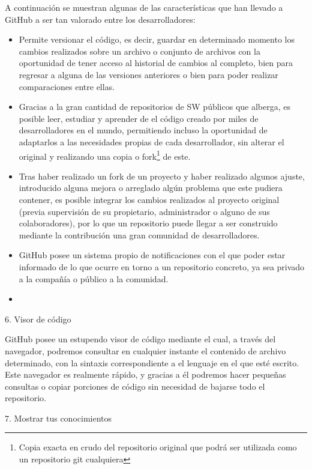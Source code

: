 A continuación se muestran algunas de las características que han llevado a GitHub a ser tan valorado entre los desarrolladores\cite{quintana2015}:

\begin{itemize}
	\item Permite versionar el código, es decir, guardar en determinado momento los cambios realizados sobre un archivo o conjunto de archivos con la oportunidad de tener acceso al historial de cambios al completo, bien para regresar a alguna de las versiones anteriores o bien para poder realizar comparaciones entre ellas.
	\item Gracias a la gran cantidad de repositorios de \gls{SW} públicos que alberga, es posible leer, estudiar y aprender de el código creado por miles de desarrolladores en el mundo, permitiendo incluso la oportunidad de adaptarlos a las necesidades propias de cada desarrollador, sin alterar el original y realizando una copia o fork\footnote{Copia exacta en crudo del repositorio original que podrá ser utilizada como un repositorio git cualquiera} de este.
	\item Tras haber realizado un fork de un proyecto y haber realizado algunos ajuste, introducido alguna mejora o arreglado algún problema que este pudiera contener, es posible integrar los cambios realizados al proyecto original (previa supervisión de su propietario, administrador o alguno de sus colaboradores), por lo que un repositorio puede llegar a ser construido mediante la contribución una gran comunidad de desarrolladores.
	\item GitHub posee un sistema propio de notificaciones con el que poder estar informado de lo que ocurre en torno a un repositorio concreto, ya sea privado a la compañía o público a la comunidad.
	\item 
\end{itemize}



6. Visor de código

GitHub posee un estupendo visor de código mediante el cual, a través del navegador, podremos consultar en cualquier instante el contenido de archivo determinado, con la sintaxis correspondiente a el lenguaje en el que esté escrito. Este navegador es realmente rápido, y gracias a él podremos hacer pequeñas consultas o copiar porciones de código sin necesidad de bajarse todo el repositorio.

7. Mostrar tus conocimientos

